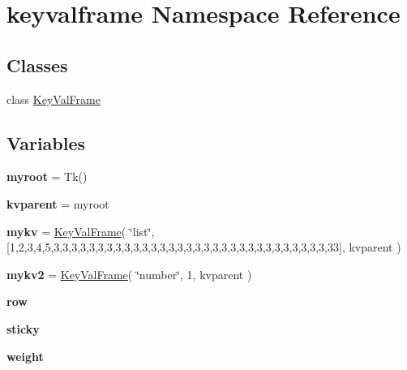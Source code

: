 \hypertarget{namespacekeyvalframe}{}\section{keyvalframe Namespace Reference}
\label{namespacekeyvalframe}
\subsection*{Classes}
\begin{DoxyCompactItemize}
\item 
class \hyperlink{classkeyvalframe_1_1KeyValFrame}{Key\+Val\+Frame}
\end{DoxyCompactItemize}
\subsection*{Variables}
\begin{DoxyCompactItemize}
\item 
{\bfseries myroot} = Tk()\hypertarget{namespacekeyvalframe_a55bb68360d5f41f3f3687fc53b146b3e}{}\label{namespacekeyvalframe_a55bb68360d5f41f3f3687fc53b146b3e}

\item 
{\bfseries kvparent} = myroot\hypertarget{namespacekeyvalframe_aa68a41bfe17f60e05fe3923833288ef0}{}\label{namespacekeyvalframe_aa68a41bfe17f60e05fe3923833288ef0}

\item 
{\bfseries mykv} = \hyperlink{classkeyvalframe_1_1KeyValFrame}{Key\+Val\+Frame}( \char`\"{}list\char`\"{}, \mbox{[}1,2,3,4,5,3,3,3,3,3,3,3,3,3,3,3,3,3,3,3,3,3,3,3,3,3,3,3,3,3,3,3,3,3,3,3,33\mbox{]}, kvparent )\hypertarget{namespacekeyvalframe_a31d8592e77e42fa927d3fa83be43c6ea}{}\label{namespacekeyvalframe_a31d8592e77e42fa927d3fa83be43c6ea}

\item 
{\bfseries mykv2} = \hyperlink{classkeyvalframe_1_1KeyValFrame}{Key\+Val\+Frame}( \char`\"{}number\char`\"{}, 1, kvparent )\hypertarget{namespacekeyvalframe_aed2be0dd030c89b6508302e98fffd795}{}\label{namespacekeyvalframe_aed2be0dd030c89b6508302e98fffd795}

\item 
{\bfseries row}\hypertarget{namespacekeyvalframe_aa8900196ffef1cdf0eaf4284fb1c4723}{}\label{namespacekeyvalframe_aa8900196ffef1cdf0eaf4284fb1c4723}

\item 
{\bfseries sticky}\hypertarget{namespacekeyvalframe_a7f9b9290084b7f3435fa765246480e68}{}\label{namespacekeyvalframe_a7f9b9290084b7f3435fa765246480e68}

\item 
{\bfseries weight}\hypertarget{namespacekeyvalframe_a6634acad064ac7c25f0c8d63f3af5fab}{}\label{namespacekeyvalframe_a6634acad064ac7c25f0c8d63f3af5fab}

\end{DoxyCompactItemize}


